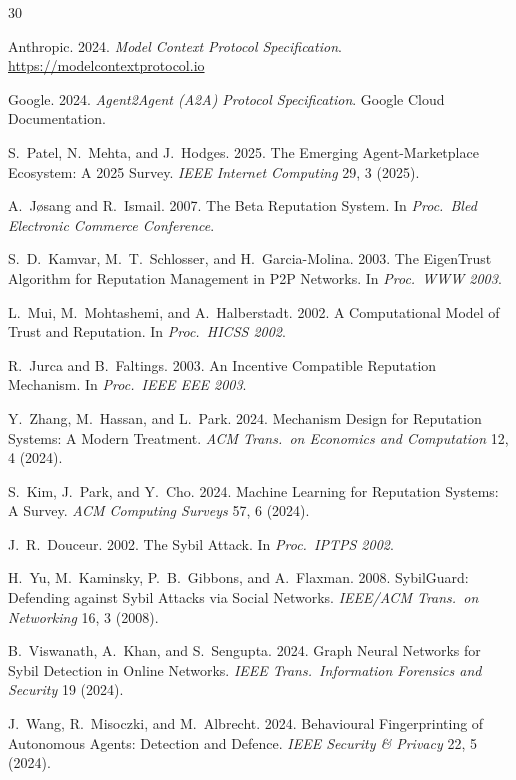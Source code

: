 \documentclass[sigconf,nonacm]{acmart}
\begin{document}
\sloppy

\begin{thebibliography}{30}

Anthropic. 2024. \textit{Model Context Protocol Specification}.
\url{https://modelcontextprotocol.io}

Google. 2024. \textit{Agent2Agent (A2A) Protocol Specification}.
Google Cloud Documentation.

S.~Patel, N.~Mehta, and J.~Hodges. 2025. The Emerging
Agent-Marketplace Ecosystem: A 2025 Survey.
\textit{IEEE Internet Computing} 29, 3 (2025).

A.~J{\o}sang and R.~Ismail. 2007. The Beta Reputation System.
In \textit{Proc.\ Bled Electronic Commerce Conference}.

S.~D.~Kamvar, M.~T.~Schlosser, and H.~Garcia-Molina. 2003. The
EigenTrust Algorithm for Reputation Management in P2P Networks.
In \textit{Proc.\ WWW 2003}.

L.~Mui, M.~Mohtashemi, and A.~Halberstadt. 2002. A Computational
Model of Trust and Reputation. In \textit{Proc.\ HICSS 2002}.

R.~Jurca and B.~Faltings. 2003. An Incentive Compatible Reputation
Mechanism. In \textit{Proc.\ IEEE EEE 2003}.

Y.~Zhang, M.~Hassan, and L.~Park. 2024. Mechanism Design for
Reputation Systems: A Modern Treatment. \textit{ACM Trans.\ on
Economics and Computation} 12, 4 (2024).

S.~Kim, J.~Park, and Y.~Cho. 2024. Machine Learning for Reputation
Systems: A Survey. \textit{ACM Computing Surveys} 57, 6 (2024).

J.~R.~Douceur. 2002. The Sybil Attack. In \textit{Proc.\ IPTPS 2002}.

H.~Yu, M.~Kaminsky, P.~B.~Gibbons, and A.~Flaxman. 2008. SybilGuard:
Defending against Sybil Attacks via Social Networks.
\textit{IEEE/ACM Trans.\ on Networking} 16, 3 (2008).

B.~Viswanath, A.~Khan, and S.~Sengupta. 2024. Graph Neural Networks
for Sybil Detection in Online Networks. \textit{IEEE Trans.\
Information Forensics and Security} 19 (2024).

J.~Wang, R.~Misoczki, and M.~Albrecht. 2024. Behavioural
Fingerprinting of Autonomous Agents: Detection and Defence.
\textit{IEEE Security \& Privacy} 22, 5 (2024).


\end{thebibliography}
\end{document}
